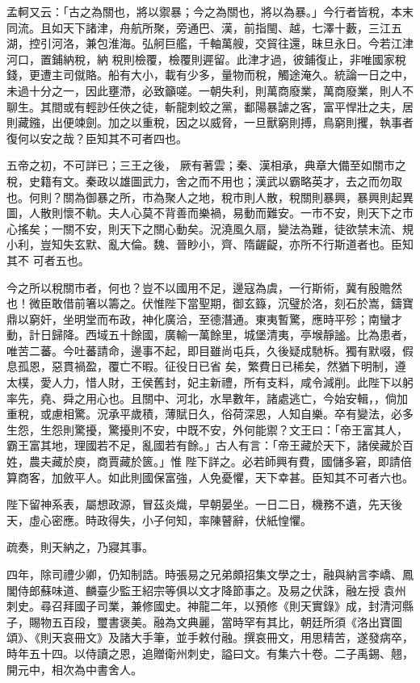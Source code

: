 \begin{pinyinscope}
 孟軻又云：「古之為關也，將以禦暴；今之為關也，將以為暴。」今行者皆稅，本末同流。且如天下諸津，舟航所聚，旁通巴、漢，前指閩、越，七澤十藪，三江五湖，控引河洛，兼包淮海。弘舸巨艦，千軸萬艘，交貿往還，昧旦永日。今若江津河口，置鋪納稅，納
 稅則檢覆，檢覆則遲留。此津才過，彼鋪復止，非唯國家稅錢，更遭主司僦賂。船有大小，載有少多，量物而稅，觸途淹久。統論一日之中，未過十分之一，因此壅滯，必致籲嗟。一朝失利，則萬商廢業，萬商廢業，則人不聊生。其間或有輕訬任俠之徒，斬龍刺蛟之黨，鄱陽暴謔之客，富平悍壯之夫，居則藏鏹，出便竦劍。加之以重稅，因之以威脅，一旦獸窮則搏，鳥窮則攫，執事者復何以安之哉？臣知其不可者四也。



 五帝之初，不可詳已；三王之後，
 厥有著雲；秦、漢相承，典章大備至如關市之稅，史籍有文。秦政以雄圖武力，舍之而不用也；漢武以霸略英才，去之而勿取也。何則？關為御暴之所，市為聚人之地，稅市則人散，稅關則暴興，暴興則起異圖，人散則懷不軌。夫人心莫不背善而樂禍，易動而難安。一市不安，則天下之市心搖矣；一關不安，則天下之關心動矣。況澆風久扇，變法為難，徒欲禁末流、規小利，豈知失玄默、亂大倫。魏、晉眇小，齊、隋齷齪，亦所不行斯道者也。臣知其不
 可者五也。



 今之所以稅關市者，何也？豈不以國用不足，邊寇為虞，一行斯術，冀有殷贍然也！微臣敢借前箸以籌之。伏惟陛下當聖期，御玄籙，沉璧於洛，刻石於嵩，鑄寶鼎以窮奸，坐明堂而布政，神化廣洽，至德潛通。東夷暫驚，應時平殄；南蠻才動，計日歸降。西域五十餘國，廣輸一萬餘里，城堡清夷，亭堠靜謐。比為患者，唯苦二蕃。今吐蕃請命，邊事不起，即目雖尚屯兵，久後疑成馳柝。獨有默啜，假息孤恩，惡貫禍盈，覆亡不暇。征役日已省
 矣，繁費日已稀矣，然猶下明制，遵太樸，愛人力，惜人財，王侯舊封，妃主新禮，所有支料，咸令減削。此陛下以躬率先，堯、舜之用心也。且關中、河北，水旱數年，諸處逃亡，今始安輯，，倘加重稅，或慮相驚。況承平歲積，薄賦日久，俗荷深恩，人知自樂。卒有變法，必多生怨，生怨則驚擾，驚擾則不安，中既不安，外何能禦？文王曰：「帝王富其人，霸王富其地，理國若不足，亂國若有餘。」古人有言：「帝王藏於天下，諸侯藏於百姓，農夫藏於庾，商賈藏於篋。」惟
 陛下詳之。必若師興有費，國儲多窘，即請倍算商客，加斂平人。如此則國保富強，人免憂懼，天下幸甚。臣知其不可者六也。



 陛下留神系表，屬想政源，冒茲炎熾，早朝晏坐。一日二日，機務不遺，先天後天，虛心密應。時政得失，小子何知，率陳瞽辭，伏紙惶懼。



 疏奏，則天納之，乃寢其事。



 四年，除司禮少卿，仍知制誥。時張易之兄弟頗招集文學之士，融與納言李嶠、鳳閣侍郎蘇味道、麟臺少監王紹宗等俱以文才降節事之。及易之伏誅，融左授
 袁州刺史。尋召拜國子司業，兼修國史。神龍二年，以預修《則天實錄》成，封清河縣子，賜物五百段，璽書褒美。融為文典麗，當時罕有其比，朝廷所須《洛出寶圖頌》、《則天哀冊文》及諸大手筆，並手敕付融。撰哀冊文，用思精苦，遂發病卒，時年五十四。以侍讀之恩，追贈衛州刺史，謚曰文。有集六十卷。二子禹錫、翹，開元中，相次為中書舍人。




\end{pinyinscope}
